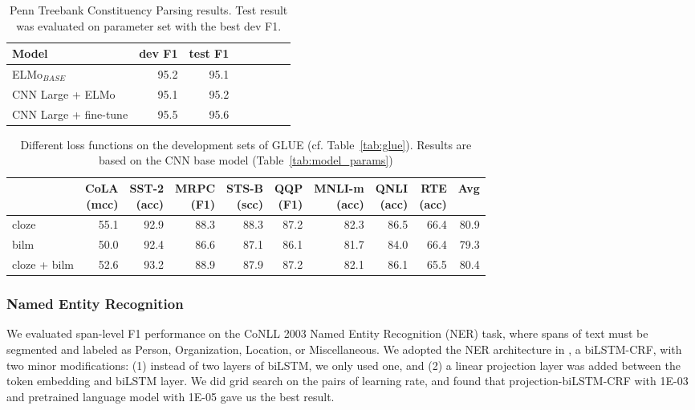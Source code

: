 \documentclass[11pt,a4paper]{article}
\begin{document}
\begin{table}[t]
\centering
\begin{tabular}{lrrrrrcr}
\toprule
\bf Model & \bf dev F1 & \bf test F1 \\ \midrule
ELMo$_{BASE}$ &  95.2 & 95.1  \\\midrule
CNN Large + ELMo & 95.1 & 95.2\\
CNN Large + fine-tune & 95.5 &95.6 \\
\bottomrule
\end{tabular}
\caption{Penn Treebank Constituency Parsing results. Test result was evaluated on parameter set with the best dev F1.}
\label{tab:parsing_results}
\end{table}


\begin{table}
\centering
\begin{tabular}{lrrrrrrrrr}
\toprule
& \thead{CoLA\\(mcc)} & \thead{SST-2\\(acc)} & \thead{MRPC\\(F1)} & \thead{STS-B\\(scc)} & \thead{QQP\\(F1)} & \thead{MNLI-m\\(acc)} & \thead{QNLI\\(acc)} & \thead{RTE\\(acc)} & Avg \\
\midrule
cloze        & 55.1 & 92.9 & 88.3 & 88.3 & 87.2 & 82.3 & 86.5 & 66.4 & 80.9 \\
bilm         & 50.0 & 92.4 & 86.6 & 87.1 & 86.1 & 81.7 & 84.0 & 66.4 & 79.3 \\
cloze + bilm & 52.6 & 93.2 & 88.9 & 87.9 & 87.2 & 82.1 & 86.1 & 65.5 & 80.4 \\
\bottomrule
\end{tabular}
\caption{Different loss functions on the development sets of GLUE (cf. Table~\ref{tab:glue}). Results are based on the CNN base model (Table~\ref{tab:model_params})}
\label{tab:loss}
\end{table}

\subsubsection{Named Entity Recognition}
\label{sec:ner}

We evaluated span-level F1 performance on the CoNLL 2003 Named Entity Recognition (NER) task, where spans of text must be segmented and labeled as Person, Organization, Location, or Miscellaneous.  We adopted the NER architecture in \citet{peters2018acl}, a biLSTM-CRF, with two minor modifications:  (1) instead of two layers of biLSTM, we only used one, and  (2) a linear projection layer was added between the token embedding and biLSTM layer. 
We did grid search on the pairs of learning rate, and found that projection-biLSTM-CRF with 1E-03 and pretrained language model with 1E-05 gave us the best result. 
\end{document}
